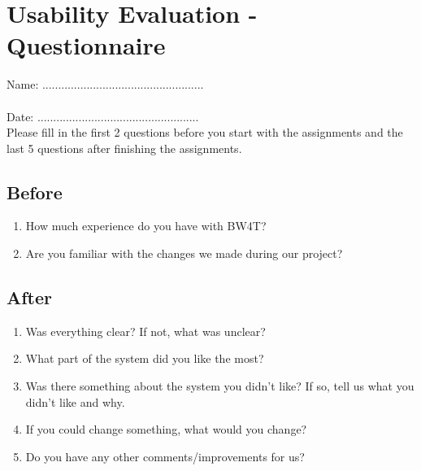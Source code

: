\section*{Usability Evaluation - Questionnaire}

Name: ................................................... \\\\
Date: ................................................... \\

Please fill in the first 2 questions before you start with the assignments and the last 5 questions after finishing the assignments.

\subsection*{Before}
\begin{enumerate}
\itemsep5em
\item How much experience do you have with BW4T?
\item Are you familiar with the changes we made during our project?
\end{enumerate}
\vspace{5em}
\subsection*{After}
\begin{enumerate}
\itemsep5em
\item Was everything clear? If not, what was unclear?
\item What part of the system did you like the most?
\item Was there something about the system you didn’t like? If so, tell us what you didn’t like and why.
\item If you could change something, what would you change?
\item Do you have any other comments/improvements for us?
\end{enumerate}

\pagebreak